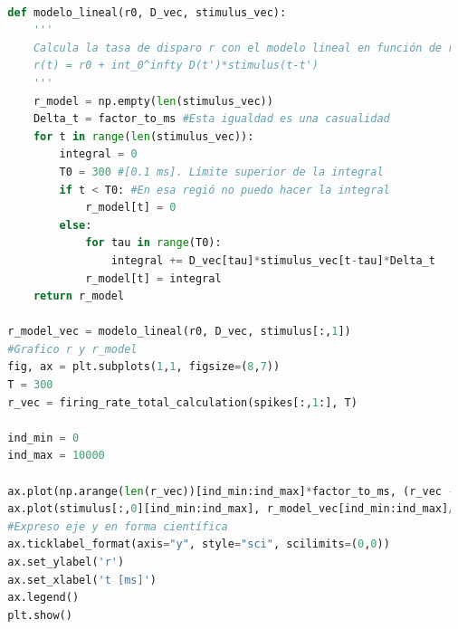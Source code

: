 \documentclass[aps,prb,twocolumn,superscriptaddress,floatfix,longbibliography]{revtex4-2}
\begin{document}
\begin{lstlisting}[language=Python]
  
  def modelo_lineal(r0, D_vec, stimulus_vec):
      '''
      Calcula la tasa de disparo r con el modelo lineal en función de r0, D_vec y stimulus. 
      r(t) = r0 + int_0^infty D(t')*stimulus(t-t')
      '''
      r_model = np.empty(len(stimulus_vec))
      Delta_t = factor_to_ms #Esta igualdad es una casualidad
      for t in range(len(stimulus_vec)):
          integral = 0
          T0 = 300 #[0.1 ms]. Límite superior de la integral
          if t < T0: #En esa regió no puedo hacer la integral
              r_model[t] = 0
          else: 
              for tau in range(T0):
                  integral += D_vec[tau]*stimulus_vec[t-tau]*Delta_t
              r_model[t] = integral
      return r_model
  
  r_model_vec = modelo_lineal(r0, D_vec, stimulus[:,1])
  #Grafico r y r_model
  fig, ax = plt.subplots(1,1, figsize=(8,7))
  T = 300
  r_vec = firing_rate_total_calculation(spikes[:,1:], T)
  
  ind_min = 0
  ind_max = 10000
  
  ax.plot(np.arange(len(r_vec))[ind_min:ind_max]*factor_to_ms, (r_vec - r0)[ind_min:ind_max], color = "tab:red", label = "$r - r_0$")
  ax.plot(stimulus[:,0][ind_min:ind_max], r_model_vec[ind_min:ind_max]/1e9, color = "tab:blue", label = "$r_{model}$")
  #Expreso eje y en forma científica
  ax.ticklabel_format(axis="y", style="sci", scilimits=(0,0))
  ax.set_ylabel('r')
  ax.set_xlabel('t [ms]')
  ax.legend()
  plt.show()
  

\end{lstlisting}


\end{document}
